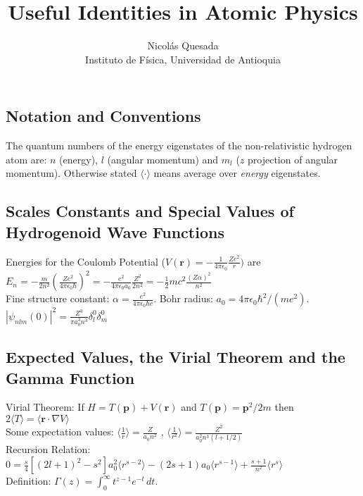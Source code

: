 \documentclass[10.5pt,letterpaper]{article}
\date{}
\title{Useful Identities in Atomic Physics}
\author{Nicol\'as Quesada\\{\small \sf Instituto de F\'isica, Universidad de Antioquia}}
\begin{document}
\maketitle
\thispagestyle{empty}
\subsection*{Notation and Conventions}
The quantum numbers of the energy eigenstates of the non-relativistic hydrogen atom are: $n$ (energy), $l$ (angular momentum) and $m_l$ ($z$ projection of angular momentum). Otherwise stated  $\langle \cdot \rangle$ means average over \emph{energy} eigenstates.

\subsection*{Scales Constants and Special Values of Hydrogenoid Wave Functions}

Energies for the Coulomb Potential ($V(\textbf{r})=-\frac{1}{4 \pi \epsilon_0}\frac{Z e^2}{r})$ are $E_n=-\frac{m}{2n^2}\left( \frac{Ze^2}{4 \pi \epsilon_0 \hbar} \right)^2=-\frac{e^2}{4 \pi \epsilon_0 a_0} \frac{Z^2}{2 n^2}=-\frac{1}{2} m c^2 \frac{(Z \alpha)^2}{n ^2}$\\

Fine structure constant: $\alpha=\frac{e^2}{4 \pi \epsilon_0 \hbar c}$. Bohr radius: $a_0=4 \pi \epsilon_0 \hbar^2/(m e^2)$. \space \space \space
$|\psi_{n l m}(0)|^2=\frac{Z^3}{\pi a_0^3 n^3} \delta_{l}^0 \delta_m^0$

\subsection*{Expected Values, the Virial Theorem and the Gamma Function}

Virial Theorem: If $H=T(\textbf{p})+V(\textbf{r})$ and $T(\textbf{p})=\textbf{p}^2/2m$ then $2\langle T \rangle=\langle \textbf{r} \cdot \nabla V \rangle$\\

Some expectation values: $\langle \frac{1}{r} \rangle=\frac{Z}{a_0 n^2}$ , $\langle \frac{1}{r^2} \rangle=\frac{Z^2}{a_0^2 n^3 (l+1/2)}$\\

Recursion Relation: $0=\frac{s}{4}\left[(2 l+1)^2-s^2 \right] a_0^2 \langle r^{s-2} \rangle-(2s+1)a_0 \langle r^{s-1} \rangle+\frac{s+1}{n^2} \langle r^s \rangle$\\

Definition: $\Gamma(z) = \int_0^\infty  t^{z-1} e^{-t}\,dt $.\\
\end{document}
